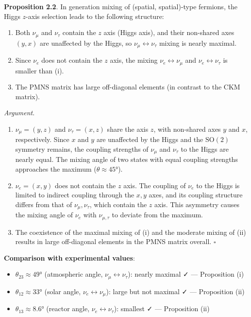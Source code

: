 \documentclass[
  a4paper,11pt]{article}
\providecommand{\tightlist}{%
  \setlength{\itemsep}{0pt}\setlength{\parskip}{0pt}}
\begin{document}
\textbf{Proposition 2.2}. In generation mixing of (spatial,
spatial)-type fermions, the Higgs \(z\)-axis selection leads to the
following structure:

\begin{enumerate}
\def\labelenumi{(\roman{enumi})}
\item
  Both \(\nu_\mu\) and \(\nu_\tau\) contain the \(z\) axis (Higgs axis),
  and their non-shared axes \((y, x)\) are unaffected by the Higgs, so
  \(\nu_\mu \leftrightarrow \nu_\tau\) mixing is nearly maximal.
\item
  Since \(\nu_e\) does not contain the \(z\) axis, the mixing
  \(\nu_e \leftrightarrow \nu_\mu\) and
  \(\nu_e \leftrightarrow \nu_\tau\) is smaller than (i).
\item
  The PMNS matrix has large off-diagonal elements (in contrast to the
  CKM matrix).
\end{enumerate}

\emph{Argument}.

\begin{enumerate}
\def\labelenumi{(\roman{enumi})}
\item
  \(\nu_\mu = (y, z)\) and \(\nu_\tau = (x, z)\) share the axis \(z\),
  with non-shared axes \(y\) and \(x\), respectively. Since \(x\) and
  \(y\) are unaffected by the Higgs and the \(\mathrm{SO}(2)\) symmetry
  remains, the coupling strengths of \(\nu_\mu\) and \(\nu_\tau\) to the
  Higgs are nearly equal. The mixing angle of two states with equal
  coupling strengths approaches the maximum (\(\theta \approx 45°\)).
\item
  \(\nu_e = (x, y)\) does not contain the \(z\) axis. The coupling of
  \(\nu_e\) to the Higgs is limited to indirect coupling through the
  \(x, y\) axes, and its coupling structure differs from that of
  \(\nu_\mu, \nu_\tau\), which contain the \(z\) axis. This asymmetry
  causes the mixing angle of \(\nu_e\) with \(\nu_{\mu,\tau}\) to
  deviate from the maximum.
\item
  The coexistence of the maximal mixing of (i) and the moderate mixing
  of (ii) results in large off-diagonal elements in the PMNS matrix
  overall. \(\square\)
\end{enumerate}

\textbf{Comparison with experimental values}:

\begin{itemize}
\tightlist
\item
  \(\theta_{23} \approx 49°\) (atmospheric angle,
  \(\nu_\mu \leftrightarrow \nu_\tau\)): nearly maximal ✓ ---
  Proposition (i)
\item
  \(\theta_{12} \approx 33°\) (solar angle,
  \(\nu_e \leftrightarrow \nu_\mu\)): large but not maximal ✓ ---
  Proposition (ii)
\item
  \(\theta_{13} \approx 8.6°\) (reactor angle,
  \(\nu_e \leftrightarrow \nu_\tau\)): smallest ✓ --- Proposition (ii)
\end{itemize}
\end{document}
